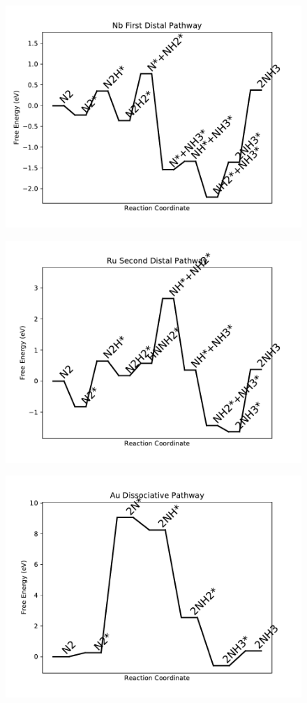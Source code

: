 \begin{figure}
\centering
\includegraphics[width=0.8\linewidth]{data/plots/Nb_distal_1.pdf}
\end{figure}

\begin{figure}
\centering
\includegraphics[width=0.8\linewidth]{data/plots/Ru_distal_2.pdf}
\end{figure}

\begin{figure}
\centering
\includegraphics[width=0.8\linewidth]{data/plots/Au_dissociative.pdf}
\end{figure}

